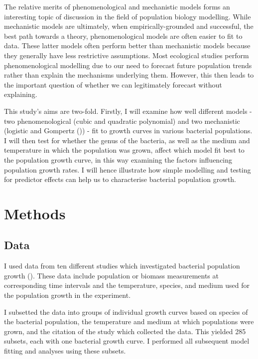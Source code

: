 \documentclass[11pt]{article}
\begin{document}
	The relative merits of phenomenological and mechanistic models forms an interesting topic of discussion in the field of population biology modelling. While mechanistic models are ultimately, when empirically-grounded and successful, the best path towards a theory, phenomenological models are often easier to fit to data. These latter models often perform better than mechanistic models because they generally have less restrictive assumptions. Most ecological studies perform phenomenological modelling due to our need to forecast future population trends rather than explain the mechanisms underlying them. However, this then leads to the important question of whether we can legitimately forecast without explaining.

	This study's aims are two-fold. Firstly, I will examine how well different models - two phenomenological (cubic and quadratic polynomial) and two mechanistic (logistic and Gompertz (\cite{gompertz1825xxiv})) - fit to growth curves in various bacterial populations. I will then test for whether the genus of the bacteria, as well as the medium and temperature in which the population was grown, affect which model fit best to the population growth curve, in this way examining the factors influencing population growth rates. I will hence illustrate how simple modelling and testing for predictor effects can help us to characterise bacterial population growth.

	
	\section{Methods}
	
	\subsection{Data}
	
	I used data from ten different studies which investigated bacterial population growth (\cite{roth1962continuity, stannard1985temperature, phillips1987relation, sivonen1990effects, gill1991growth, zwietering1994modeling, bae2014growth, galarz2016predicting, bernhardt2018metabolic, silva2018modelling}). These data include population or biomass measurements at corresponding time intervals and the temperature, species, and medium used for the population growth in the experiment.
	
	I subsetted the data into groups of individual growth curves based on species of the bacterial population, the temperature and medium at which populations were grown, and the citation of the study which collected the data. This yielded 285 subsets, each with one bacterial growth curve. I performed all subsequent model fitting and analyses using these subsets.
	
\end{document}
